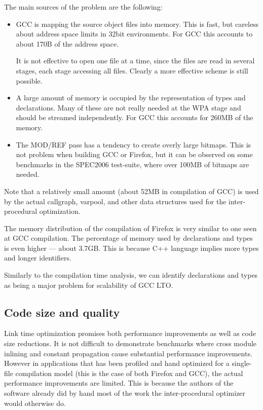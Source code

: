 \documentclass[final]{ols}
\begin{document}
The main sources of the problem are the following:
\begin{itemize}
\item GCC is mapping the source object files into memory.  This is fast, but
careless about address space limits in 32bit environments.  For GCC this accounts to about 170B of
the address space. 

It is not effective to open one file at a time, since the files are read in
several stages, each stage accessing all files. Clearly a more effective
scheme is still possible.
\item A large amount of memory is occupied by the representation of types and declarations.
Many of these are not really needed at the WPA stage and should be streamed independently.
For GCC this accounts for 260MB of the memory.
\item The MOD/REF pass has a tendency to create overly large bitmaps.  This is not
problem when building GCC or Firefox, but it can be observed on some benchmarks in
the SPEC2006 test-suite, where over 100MB of bitmaps are needed.
\end{itemize}

Note that a relatively small amount (about 52MB in compilation of GCC) is used by the actual
callgraph, varpool, and other data structures used for the inter-procedural
optimization.%

The memory distribution of the compilation of Firefox is very similar to one seen at GCC compilation. The
percentage of memory used by declarations and types is even higher --- about
3.7GB. This is because C++ language implies more types and longer identifiers.

Similarly to the compilation time analysis, we can identify declarations and types
as being a major problem for scalability of GCC LTO.  

\subsection{Code size and quality}

Link time optimization promises both performance improvements as well as code size
reductions.  It is not difficult to demonstrate benchmarks where cross module
inlining and constant propagation cause substantial performance improvements.
However in applications that has been profiled and hand optimized for a single-file
compilation model (this is the case of both Firefox and GCC), the actual
performance improvements are limited. This is because the authors of the
software already did by hand most of the work the inter-procedural optimizer
would otherwise do.
\end{document}
